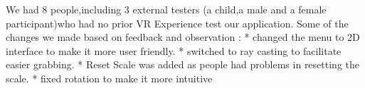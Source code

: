 We had 8 people,including  3 external testers (a child,a male and a female participant)who had no prior VR Experience test our application.
Some of the changes we made based on feedback and observation :
  * changed the menu to 2D interface to make it more user friendly.
  * switched to ray casting to facilitate easier grabbing.
  * Reset Scale was added as people had problems in resetting the scale.
  * fixed rotation to make it more intuitive